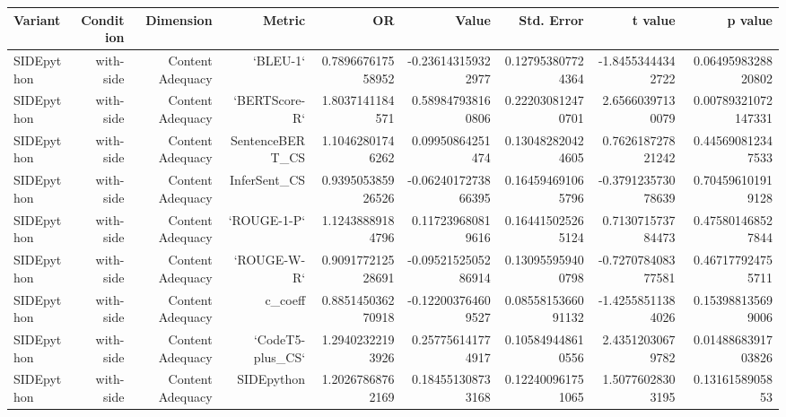 \begin{tabular}{lrrrrrrrr}
\hline
Variant & Condition & Dimension & Metric & OR & Value & Std. Error & t value & p value
\\
\hline
SIDEpython & with-side & Content Adequacy & `BLEU-1` & 0.789667617558952 & -0.236143159322977 & 0.127953807724364 & -1.84553444342722 & 0.0649598328820802
\\
SIDEpython & with-side & Content Adequacy & `BERTScore-R` & 1.8037141184571 & 0.589847938160806 & 0.222030812470701 & 2.65660397130079 & 0.00789321072147331
\\
SIDEpython & with-side & Content Adequacy & SentenceBERT\_CS & 1.10462801746262 & 0.09950864251474 & 0.130482820424605 & 0.762618727821242 & 0.445690812347533
\\
SIDEpython & with-side & Content Adequacy & InferSent\_CS & 0.939505385926526 & -0.0624017273866395 & 0.164594691065796 & -0.379123573078639 & 0.704596101919128
\\
SIDEpython & with-side & Content Adequacy & `ROUGE-1-P` & 1.12438889184796 & 0.117239680819616 & 0.164415025265124 & 0.713071573784473 & 0.475801468527844
\\
SIDEpython & with-side & Content Adequacy & `ROUGE-W-R` & 0.909177212528691 & -0.0952152505286914 & 0.130955959400798 & -0.727078408377581 & 0.467177924755711
\\
SIDEpython & with-side & Content Adequacy & c\_coeff & 0.885145036270918 & -0.122003764609527 & 0.0855815366091132 & -1.42558511384026 & 0.153988135699006
\\
SIDEpython & with-side & Content Adequacy & `CodeT5-plus\_CS` & 1.29402322193926 & 0.257756141774917 & 0.105849448610556 & 2.43512030679782 & 0.0148868391703826
\\
SIDEpython & with-side & Content Adequacy & SIDEpython & 1.20267868762169 & 0.184551308733168 & 0.122400961751065 & 1.50776028303195 & 0.1316158905853
\\
\hline
\end{tabular}
